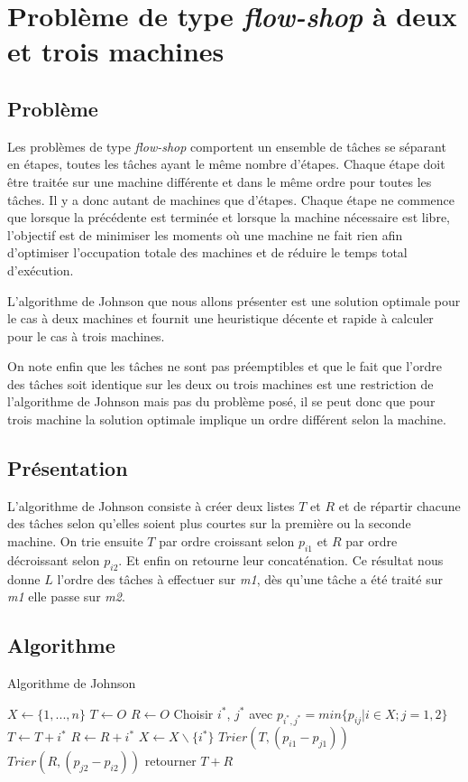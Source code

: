 \section{Problème de type {\em flow-shop} à deux et trois machines}
\subsection{Problème}
Les problèmes de type {\em flow-shop} comportent un ensemble de tâches se
séparant en étapes, toutes les tâches ayant le même nombre d'étapes. Chaque
étape doit être traitée sur une machine différente et dans le même ordre pour
toutes les tâches. Il y a donc autant de machines que d'étapes. Chaque étape ne
commence que lorsque la précédente est terminée et lorsque la machine nécessaire
est libre, l'objectif est de minimiser les moments où une machine ne fait rien
afin d'optimiser l'occupation totale des machines et de réduire le temps total
d'exécution.

L'algorithme de Johnson que nous allons présenter est une solution optimale pour
le cas à deux machines et fournit une heuristique décente et rapide à calculer
pour le cas à trois machines.

On note enfin que les tâches ne sont pas préemptibles et que le fait que l'ordre
des tâches soit identique sur les deux ou trois machines est une restriction de
l'algorithme de Johnson mais pas du problème posé, il se peut donc que pour
trois machine la solution optimale implique un ordre différent selon la
machine.

\subsection{Présentation}
L'algorithme de Johnson consiste à créer deux listes $T$ et $R$ et de répartir
chacune des tâches selon qu'elles soient plus courtes sur la première ou la
seconde machine. On trie ensuite $T$ par ordre croissant selon $p_{i1}$ et $R$ par
ordre décroissant selon $p_{i2}$. Et enfin on retourne leur concaténation.
Ce résultat nous donne $L$ l'ordre des tâches à effectuer sur {\em m1},
dès qu'une tâche a été traité sur {\em m1} elle passe sur {\em m2}.

\subsection{Algorithme}
\begin{algorithm}
\caption{Algorithme de Johnson}
\begin{algorithmic}
\STATE $X \leftarrow \{1,...,n\}$
\STATE $T \leftarrow O$
\STATE $R \leftarrow O$
	\STATE Choisir $i^*$, $j^*$ avec $p_{i^*,j^*} = min\{p_{ij}|i \in X; j = 1,2\}$
		\STATE $T \leftarrow T + i^*$
	\ELSE
		\STATE $R \leftarrow R + i^*$
	\ENDIF
	\STATE $X \leftarrow X\backslash\{i^*\}$
\ENDWHILE
\STATE $Trier(T, (p_{i1} - p_{j1}))$
\STATE $Trier(R, (p_{j2} - p_{i2}))$
\STATE retourner $T + R$
\end{algorithmic}
\end{algorithm}

